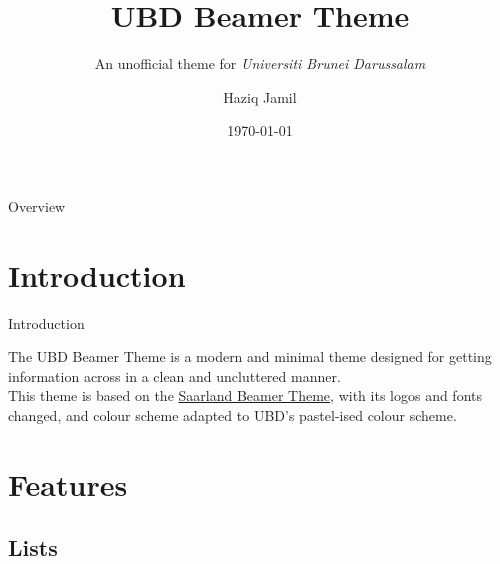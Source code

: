 \documentclass[]{beamer}
\author{Haziq Jamil}
\title{UBD Beamer Theme}
\subtitle{An unofficial theme for \textit{Universiti Brunei Darussalam}}
\institute{Mathematical Sciences, Faculty of Science, UBD\\ \url{https://haziqj.ml}}
\date{\today}
\begin{document}
\begin{frame}[plain]
	\titlepage
\end{frame}

\begin{frame}{Overview}
\tableofcontents
\end{frame}



\section{Introduction}

\begin{frame}{Introduction}

The UBD Beamer Theme is a modern and minimal theme designed for getting information across in a clean and uncluttered manner.\\[1em]

This theme is based on the \href{https://github.com/kailashbuki/beamerthemesaarland}{Saarland Beamer Theme}, with its logos and fonts changed, and colour scheme adapted to UBD's pastel-ised colour scheme.
	
\end{frame}

\section{Features}
	
\subsection{Lists}
\end{document}

